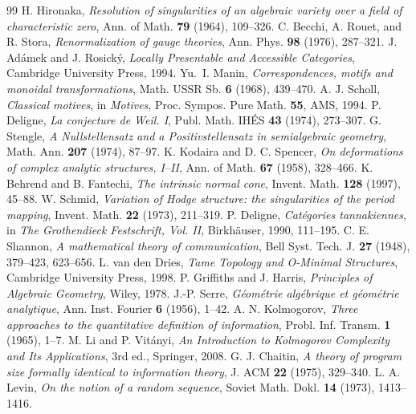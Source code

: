 \begin{thebibliography}{99}
 H. Hironaka, \emph{Resolution of singularities of an algebraic variety over a field of characteristic zero}, Ann. of Math. \textbf{79} (1964), 109--326.
 C. Becchi, A. Rouet, and R. Stora, \emph{Renormalization of gauge theories}, Ann. Phys. \textbf{98} (1976), 287--321.
 J. Ad\'amek and J. Rosick\'y, \emph{Locally Presentable and Accessible Categories}, Cambridge University Press, 1994.
 Yu.~I. Manin, \emph{Correspondences, motifs and monoidal transformations}, Math. USSR Sb. \textbf{6} (1968), 439--470.
 A. J. Scholl, \emph{Classical motives}, in \emph{Motives}, Proc. Sympos. Pure Math. \textbf{55}, AMS, 1994.
 P. Deligne, \emph{La conjecture de Weil. I}, Publ. Math. IH\'ES \textbf{43} (1974), 273--307.
 G. Stengle, \emph{A Nullstellensatz and a Positivstellensatz in semialgebraic geometry}, Math. Ann. \textbf{207} (1974), 87--97.
 K. Kodaira and D. C. Spencer, \emph{On deformations of complex analytic structures, I--II}, Ann. of Math. \textbf{67} (1958), 328--466.
 K. Behrend and B. Fantechi, \emph{The intrinsic normal cone}, Invent. Math. \textbf{128} (1997), 45--88.
 W. Schmid, \emph{Variation of Hodge structure: the singularities of the period mapping}, Invent. Math. \textbf{22} (1973), 211--319.
 P. Deligne, \emph{Cat\'egories tannakiennes}, in \emph{The Grothendieck Festschrift, Vol. II}, Birkh\"auser, 1990, 111--195.
 C. E. Shannon, \emph{A mathematical theory of communication}, Bell Syst. Tech. J. \textbf{27} (1948), 379--423, 623--656.
 L. van den Dries, \emph{Tame Topology and O-Minimal Structures}, Cambridge University Press, 1998.
 P. Griffiths and J. Harris, \emph{Principles of Algebraic Geometry}, Wiley, 1978.
 J.-P. Serre, \emph{G\'eom\'etrie alg\'ebrique et g\'eom\'etrie analytique}, Ann. Inst. Fourier \textbf{6} (1956), 1--42.
 A. N. Kolmogorov, \emph{Three approaches to the quantitative definition of information}, Probl. Inf. Transm. \textbf{1} (1965), 1--7.
 M. Li and P. Vit\'anyi, \emph{An Introduction to Kolmogorov Complexity and Its Applications}, 3rd ed., Springer, 2008.
 G. J. Chaitin, \emph{A theory of program size formally identical to information theory}, J. ACM \textbf{22} (1975), 329--340.
 L. A. Levin, \emph{On the notion of a random sequence}, Soviet Math. Dokl. \textbf{14} (1973), 1413--1416.

\end{thebibliography}
